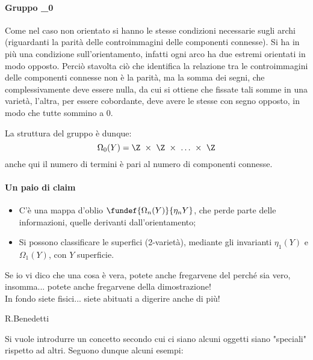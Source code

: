 \paragraph{Gruppo \Omega_0}
Come nel caso non orientato si hanno le stesse condizioni necessarie sugli archi (riguardanti la parità delle controimmagini delle componenti connesse). Si ha in più una condizione sull'orientamento, infatti ogni arco ha due estremi orientati in modo opposto.
Perciò stavolta ciò che identifica la relazione tra le controimmagini delle componenti connesse non è la parità, ma la somma dei segni, che complessivamente deve essere nulla, da cui si ottiene che fissate tali somme in una varietà, l'altra, per essere cobordante, deve avere le stesse con segno opposto, in modo che tutte sommino a 0.

La struttura del gruppo è dunque: 
\begin{equation*}
\Omega_0(Y) = \Z~\times~\Z~\times~\dots~\times~\Z
\end{equation*}
anche qui il numero di termini è pari al numero di componenti connesse.


\paragraph{Un paio di claim}
\begin{itemize}
\item C'è una mappa d'oblio $\fundef{\Omega_n(Y)}{\eta_n{Y}}$, che perde parte delle informazioni, quelle derivanti dall'orientamento;
\item Si possono classificare le superfici (2-varietà), mediante gli invarianti $\eta_1(Y)$ e $\Omega_1(Y)$, con $Y$ superficie.
\end{itemize}


\epigraph{Se io vi dico che una cosa è vera, potete anche fregarvene del perché sia vero, insomma... potete anche fregarvene della dimostrazione!\\ In fondo siete fisici... siete abituati a digerire anche di più!}{R.Benedetti}

Si vuole introdurre un concetto secondo cui ci siano alcuni oggetti siano "speciali" rispetto ad altri. Seguono dunque alcuni esempi:

